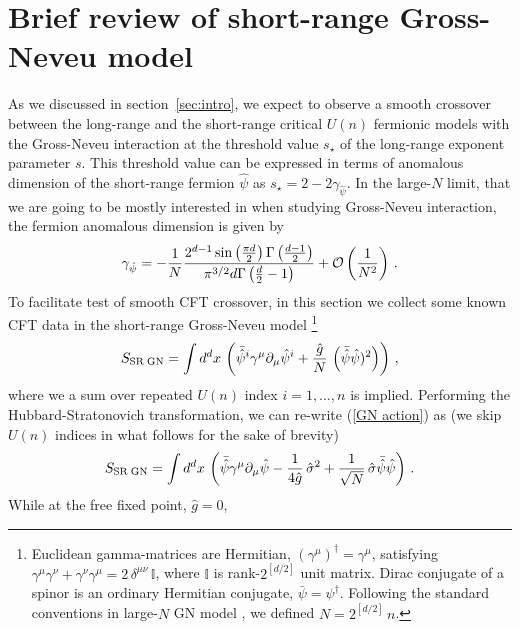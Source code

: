 \documentclass[aps,amsmath,amssymb,prd,showpacs,floatfix,preprint,superscriptaddress,nofootinbib,12pt]{article}
\begin{document}
\section{Brief review of short-range Gross-Neveu model}
\label{sec: SR GN}
As we discussed in section~\ref{sec:intro}, we expect to observe
a smooth crossover between the long-range and the short-range critical $U(n)$
fermionic models with the Gross-Neveu interaction
at the threshold value $s_\star$ of the long-range exponent parameter $s$. This threshold value can be expressed
 in terms
of anomalous dimension of the short-range fermion $\hat\psi$ as $s_\star = 2 - 2\gamma_{\hat\psi}$. In the large-$N$
limit, that we are going to be mostly interested in when studying Gross-Neveu interaction, the
fermion anomalous dimension is given by \cite{Zinn-Justin:1991ksq,Gracey:1990wi}
\begin{equation}
\label{gamma hat psi}
\gamma_{\hat\psi}=-\frac{1}{N}\frac{2^{d-1} \sin \left(\frac{\pi  d}{2}\right)
\Gamma \left(\frac{d-1}{2}\right)}{\pi ^{3/2} d \Gamma \left(\frac{d}{2}-1\right)}
+{\cal O}\left(\frac{1}{N^2}\right)\,.
\end{equation}
To facilitate test of smooth CFT crossover, in this section we collect some known
CFT data in the short-range Gross-Neveu model \cite{Gross:1974jv} \footnote{Euclidean gamma-matrices are Hermitian, $(\gamma^\mu)^\dagger = \gamma^\mu$,
satisfying $\gamma^\mu\gamma^\nu+\gamma^\nu\gamma^\mu =2\,\delta^{\mu\nu}\,\mathbb{I}$, where $\mathbb{I}$
is rank-$2^{[d/2]}$ unit matrix.
Dirac conjugate of a spinor is an ordinary Hermitian conjugate, $\bar\psi = \psi^\dagger$. Following the standard conventions in large-$N$ GN model \cite{Zinn-Justin:1991ksq}, we defined
$N=2^{[d/2]}\,n$.}
\begin{align}
\label{GN action}
S_{\textrm{SR\;GN}} = \int d^dx \, \left(  \bar{\hat\psi}^i \gamma^\mu \partial _\mu \hat\psi ^i +
\frac{\hat g}{N}\,\left(\bar{\hat\psi}\hat\psi)^2 \right)\right)\,,
\end{align}
where we a sum over repeated $U(n)$ index $i=1,\dots,n$ is implied.
Performing the Hubbard-Stratonovich transformation, we can 
re-write (\ref{GN action}) as (we skip $U(n)$ indices in what follows for the sake of brevity)
\begin{align}
\label{GN action HS}
S_{\textrm{SR\;GN}}  = \int d^dx \, \left( \bar{\hat\psi} \gamma^\mu \partial _\mu \hat\psi 
-\frac{1}{4 \hat g}\,\hat\sigma^2 + \frac{1}{\sqrt{N}}\,\hat\sigma\bar{\hat\psi}\hat\psi \right)\,.
\end{align}
While at the free fixed point, $\hat g=0$,
\end{document}
